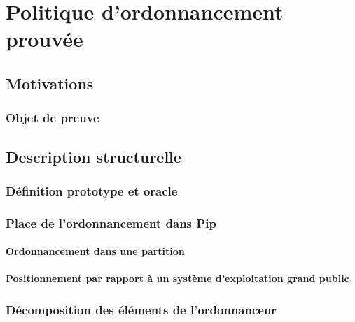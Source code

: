 \chapter{Politique d'ordonnancement prouvée}

	\section{Motivations}

		\subsection{Objet de preuve}
	

	\section{Description structurelle}

		\subsection{Définition prototype et oracle}

		\subsection{Place de l'ordonnancement dans Pip}
			\subsubsection{Ordonnancement dans une partition}
			\subsubsection{Positionnement par rapport à un système d'exploitation grand public}

		\subsection{Décomposition des éléments de l'ordonnanceur}
